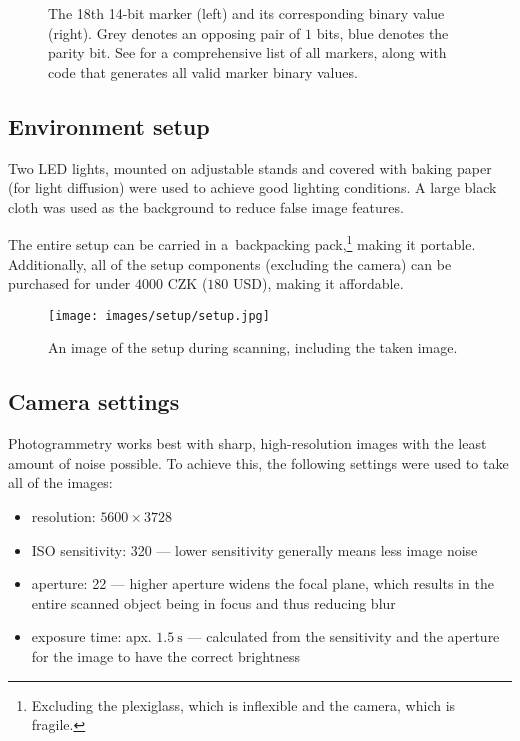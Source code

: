 \begin{figure}[t]
	\centering
	
	\caption{The 18th 14-bit marker (left) and its corresponding binary value (right). Grey denotes an opposing pair of $1$ bits, blue denotes the parity bit. See \cite{targetsPost} for a comprehensive list of all markers, along with code that generates all valid marker binary values.}
\end{figure}

\subsection{Environment setup}
Two LED lights, mounted on adjustable stands and covered with baking paper (for light diffusion) were used to achieve good lighting conditions.
A large black cloth was used as the background to reduce false image features.

The entire setup can be carried in a~backpacking pack,\footnote{Excluding the plexiglass, which is inflexible and the camera, which is fragile.} making it portable.
Additionally, all of the setup components (excluding the camera) can be purchased for under $4000$ CZK ($180$ USD), making it affordable.

\begin{figure}
	\centering
	\texttt{[image: images/setup/setup.jpg]}
	\caption{An image of the setup during scanning, including the taken image.}
	\label{fig:setup}
\end{figure}

\subsection{Camera settings}\label{sec:camsettings}
Photogrammetry works best with sharp, high-resolution images with the least amount of noise possible.
To achieve this, the following settings were used to take all of the images:
\begin{itemize}
	\item resolution: $5600 \times 3728$
	\item ISO sensitivity: 320 --- lower sensitivity generally means less image noise
	\item aperture: 22 --- higher aperture widens the focal plane, which results in the entire scanned object being in focus and thus reducing blur
	\item exposure time: apx. $\SI{1.5}{\second}$ --- calculated from the sensitivity and the aperture for the image to have the correct brightness
\end{itemize}

